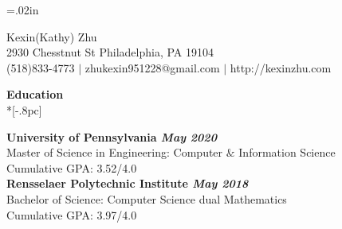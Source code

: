 \oddsidemargin=-0.13in
\evensidemargin=.02in
\textwidth=7in
\topmargin=-1.2in
\textheight=7in
\parindent=0in
\pagestyle{empty}

\newenvironment{list1}{
  \begin{list}{\ding{113}}{%
      \setlength{\itemsep}{0in}
      \setlength{\parsep}{0in} \setlength{\parskip}{0in}
      \setlength{\topsep}{0in} \setlength{\partopsep}{0in}
      \setlength{\leftmargin}{0.17in}}}{\end{list}}
\newenvironment{list2}{
  \begin{list}{$\bullet$}{%
      \setlength{\itemsep}{0in}
      \setlength{\parsep}{0in} \setlength{\parskip}{0in}
      \setlength{\topsep}{0in} \setlength{\partopsep}{0in}
      \setlength{\leftmargin}{0.2in}}}{\end{list}}

\vspace*{-.05in}


\begin{center}
{\huge Kexin(Kathy) Zhu} \\[.5pc]

2930 Chesstnut St Philadelphia, PA 19104\\
(518)833-4773 $|$ zhukexin951228@gmail.com $|$ http://kexinzhu.com  \\
\end{center}



{\large \bf Education} \\*[-.8pc]
\underline{\hspace{7in}} 

{\bf University of Pennsylvania \hfill \it May 2020 }\\
\rm Master of Science in Engineering:  Computer $\&$ Information Science \rm \\
Cumulative GPA: 3.52/4.0\rm\\

{\bf Rensselaer Polytechnic Institute \hfill \it May 2018 }\\
Bachelor of Science:  Computer Science  dual  Mathematics \rm \\
\rm Cumulative GPA: 3.97/4.0   \\
%




